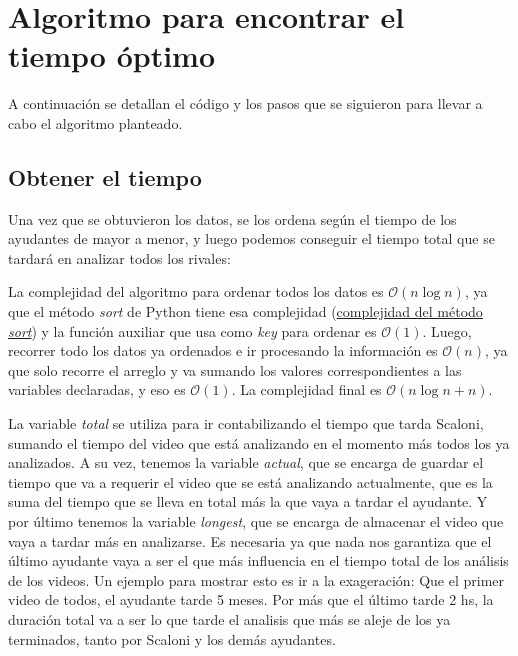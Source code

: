 \section{Algoritmo para encontrar el tiempo óptimo}

A continuación se detallan el código y los pasos que se siguieron para llevar a cabo el algoritmo planteado.

\subsection{Obtener el tiempo}

Una vez que se obtuvieron los datos, se los ordena según el tiempo de los ayudantes de mayor a menor, y luego podemos conseguir el tiempo total que se tardará en analizar todos los rivales:



La complejidad del algoritmo para ordenar todos los datos es $\mathcal{O}\left(n \log n\right)$, ya que el método \textit{sort} de Python tiene esa complejidad (\href{https://www.geeksforgeeks.org/sort-in-python/}{complejidad del método \textit{sort}}) y la función auxiliar que usa como \textit{key} para ordenar es $\mathcal{O}(1)$. Luego, recorrer todo los datos ya ordenados e ir procesando la información es $\mathcal{O}(n)$, ya que solo recorre el arreglo y va sumando los valores correspondientes a las variables declaradas, y eso es $\mathcal{O}(1)$. La complejidad final es $\mathcal{O}\left(n \log n + n\right)$.

La variable \textit{total} se utiliza para ir contabilizando el tiempo que tarda Scaloni, sumando el tiempo del video que está analizando en el momento más todos los ya analizados. A su vez, tenemos la variable \textit{actual}, que se encarga de guardar el tiempo que va a requerir el video que se está analizando actualmente, que es la suma del tiempo que se lleva en total más la que vaya a tardar el ayudante. Y por último tenemos la variable \textit{longest}, que se encarga de almacenar el video que vaya a tardar más en analizarse. Es necesaria ya que nada nos garantiza que el último ayudante vaya a ser el que más influencia en el tiempo total de los análisis de los videos. Un ejemplo para mostrar esto es ir a la exageración: Que el primer video de todos, el ayudante tarde 5 meses. Por más que el último tarde 2 hs, la duración total va a ser lo que tarde el analisis que más se aleje de los ya terminados, tanto por Scaloni y los demás ayudantes.
